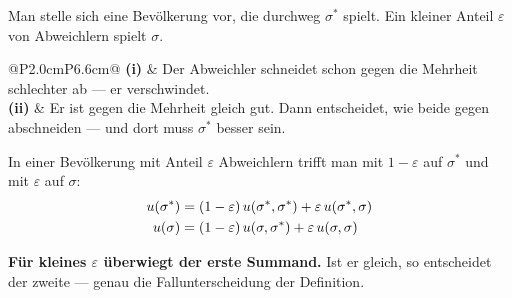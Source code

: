 \begin{merksatz}
Man stelle sich eine Bevölkerung vor, die durchweg $\sigma^{*}$ spielt. Ein kleiner Anteil $\varepsilon$ von Abweichlern spielt $\sigma$.

\begin{center}
{\small
\renewcommand{\arraystretch}{1.5}
\begin{tabular}{@{}P{2.0cm}P{6.6cm}@{}}
\toprule
\textbf{(i)} & Der Abweichler schneidet schon gegen die Mehrheit schlechter ab --- er verschwindet.\\
\textbf{(ii)} & Er ist gegen die Mehrheit gleich gut. Dann entscheidet, wie beide gegen  abschneiden --- und dort muss $\sigma^{*}$ besser sein.\\
\bottomrule
\end{tabular}}
\end{center}

In einer Bevölkerung mit Anteil $\varepsilon$ Abweichlern trifft man mit $1-\varepsilon$ auf $\sigma^{*}$ und mit $\varepsilon$ auf $\sigma$:
\begin{align*}
u(\sigma^{*}) &= (1-\varepsilon)\,u(\sigma^{*},\sigma^{*}) + \varepsilon\,u(\sigma^{*},\sigma)\\
u(\sigma) &= (1-\varepsilon)\,u(\sigma,\sigma^{*}) + \varepsilon\,u(\sigma,\sigma)
\end{align*}

\begin{center}
\begin{minipage}{0.9\textwidth}
\textbf{Für kleines $\varepsilon$ überwiegt der erste Summand.} Ist er gleich, so entscheidet der zweite --- genau die Fallunterscheidung der Definition.
\end{minipage}
\end{center}

\begin{center}
\begin{minipage}{0.88\textwidth}
\end{minipage}
\end{center}
\end{merksatz}

